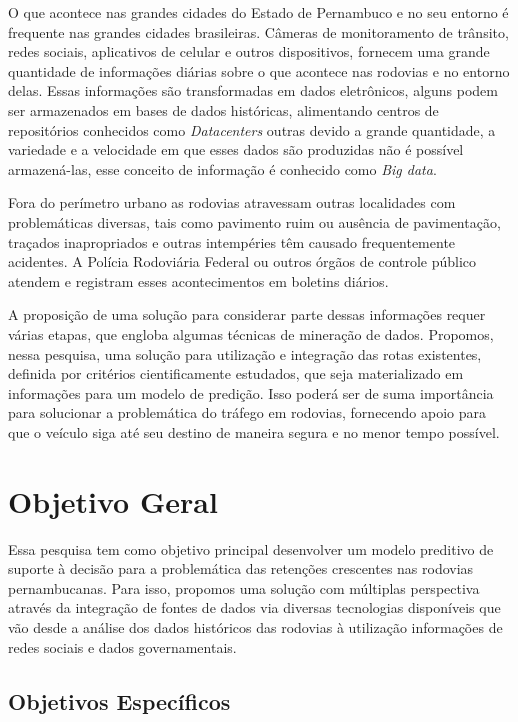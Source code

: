 O que acontece nas grandes cidades do Estado de Pernambuco e no seu entorno é frequente nas grandes cidades brasileiras.
Câmeras de monitoramento de trânsito, redes sociais, aplicativos de celular e outros dispositivos, fornecem uma grande quantidade de informações diárias sobre o que acontece nas rodovias e no entorno delas. Essas informações são transformadas em dados eletrônicos, alguns podem ser armazenados em bases de dados históricas, alimentando centros de repositórios conhecidos como \textit{Datacenters} outras devido a grande quantidade, a variedade e a velocidade em que esses dados são produzidas não é possível armazená-las, esse conceito de informação é conhecido como \textit{Big data}.

Fora do perímetro urbano as rodovias atravessam outras localidades com problemáticas diversas, tais como pavimento ruim ou ausência de pavimentação, 
traçados inapropriados e outras intempéries têm causado frequentemente acidentes.
A Polícia Rodoviária Federal ou outros órgãos de controle público atendem e registram esses acontecimentos em boletins diários.

A proposição de uma solução para considerar parte dessas informações requer várias etapas, que engloba algumas técnicas de mineração de dados.
Propomos, nessa pesquisa, uma solução para utilização e integração das rotas existentes, definida por critérios cientificamente estudados, que seja materializado em informações para um modelo de predição.
Isso poderá ser de suma importância para solucionar a problemática do tráfego em rodovias, fornecendo apoio para que o veículo siga até seu destino de maneira segura e no menor tempo possível.



\pagebreak
\section{ Objetivo Geral}\label{intro:objetivo}

Essa pesquisa tem como objetivo principal desenvolver um modelo preditivo de suporte à decisão para a problemática das retenções crescentes nas rodovias pernambucanas. 
Para isso, propomos uma solução com múltiplas perspectiva através da integração de fontes de dados via diversas tecnologias disponíveis que vão desde a análise dos dados históricos das 
rodovias à utilização informações de redes sociais e dados governamentais.

\subsection{ Objetivos Específicos}\label{intro:especificos}

